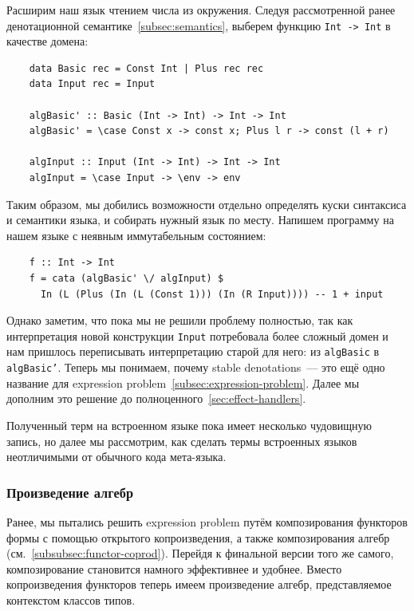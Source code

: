 Расширим наш язык чтением числа из окружения.
Следуя рассмотренной ранее денотационной семантике~\ref{subsec:semantics}, выберем функцию \texttt{Int -> Int} в качестве домена:
\begin{verbatim}
    data Basic rec = Const Int | Plus rec rec
    data Input rec = Input

    algBasic' :: Basic (Int -> Int) -> Int -> Int
    algBasic' = \case Const x -> const x; Plus l r -> const (l + r)

    algInput :: Input (Int -> Int) -> Int -> Int
    algInput = \case Input -> \env -> env
\end{verbatim}

Таким образом, мы добились возможности отдельно определять куски синтаксиса и семантики языка, и собирать нужный язык по месту.
Напишем программу на нашем языке с неявным иммутабельным состоянием:
\begin{verbatim}
    f :: Int -> Int
    f = cata (algBasic' \/ algInput) $
      In (L (Plus (In (L (Const 1))) (In (R Input)))) -- 1 + input
\end{verbatim}

Однако заметим, что пока мы не решили проблему полностью, так как интерпретация новой конструкции \texttt{Input} потребовала более сложный домен и нам пришлось переписывать интерпретацию старой для него: из \texttt{algBasic} в \texttt{algBasic'}.
Теперь мы понимаем, почему stable denotations~--- это ещё одно название для expression problem~\ref{subsec:expression-problem}.
Далее мы дополним это решение до полноценного~\ref{sec:effect-handlers}.

Полученный терм на встроенном языке пока имеет несколько чудовищную запись, но далее мы рассмотрим, как сделать термы встроенных языков неотличимыми от обычного кода мета-языка.

\subsubsection{Произведение алгебр}


Ранее, мы пытались решить expression problem путём композирования функторов формы с помощью открытого копроизведения, а также композирования алгебр (см.~\ref{subsubsec:functor-coprod}).
Перейдя к финальной версии того же самого, композирование становится намного эффективнее и удобнее.
Вместо копроизведения функторов теперь имеем произведение алгебр, представляемое контекстом классов типов.

